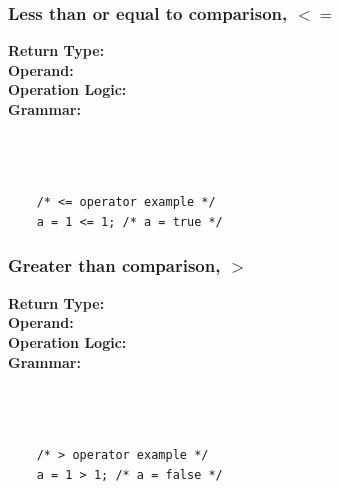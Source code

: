 \documentclass{article}
\begin{document}
    \subsubsection{Less than or equal to comparison, $<=$}
    \textbf{Return Type:}\\
    \textbf{Operand:}\\
    \textbf{Operation Logic:}\\
    \textbf{Grammar:}\\
    \\
    \\
    \\
    \begin{lstlisting}
    /* <= operator example */
    a = 1 <= 1; /* a = true */
    \end{lstlisting}
    
    \subsubsection{Greater than comparison, $>$}
    \textbf{Return Type:}\\
    \textbf{Operand:}\\
    \textbf{Operation Logic:}\\
    \textbf{Grammar:}\\
    \\
    \\
    \\
    \begin{lstlisting}
    /* > operator example */
    a = 1 > 1; /* a = false */
    \end{lstlisting}
    
\end{document}
